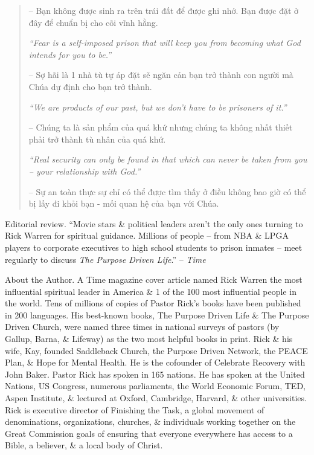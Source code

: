 \documentclass{article}
\begin{document}
\begin{enumerate}
\begin{quotation}
		-- Bạn không được sinh ra trên trái đất để được ghi nhớ. Bạn được đặt ở đây để chuẩn bị cho cõi vĩnh hằng.

		{\it``Fear is a self-imposed prison that will keep you from becoming what God intends for you to be.''}

		-- Sợ hãi là 1 nhà tù tự áp đặt sẽ ngăn cản bạn trở thành con người mà Chúa dự định cho bạn trở thành.

		{\it``We are products of our past, but we don't have to be prisoners of it.''}

		-- Chúng ta là sản phẩm của quá khứ nhưng chúng ta không nhất thiết phải trở thành tù nhân của quá khứ.

		{\it``Real security can only be found in that which can never be taken from you -- your relationship with God.''}

		-- Sự an toàn thực sự chỉ có thể được tìm thấy ở điều không bao giờ có thể bị lấy đi khỏi bạn - mối quan hệ của bạn với Chúa.
	\end{quotation}
	{\sf Editorial review.} ``Movie stars \& political leaders aren't the only ones turning to {\sc Rick Warren} for spiritual guidance. Millions of people -- from NBA \& LPGA players to corporate executives to high school students to prison inmates -- meet regularly to discuss {\it The Purpose Driven Life}.'' -- {\it Time}

	{\sf About the Author.} A Time magazine cover article named Rick Warren the most influential spiritual leader in America \& 1 of the 100 most influential people in the world. Tens of millions of copies of Pastor Rick's books have been published in 200 languages. His best-known books, The Purpose Driven Life \& The Purpose Driven Church, were named three times in national surveys of pastors (by Gallup, Barna, \& Lifeway) as the two most helpful books in print. Rick \& his wife, Kay, founded Saddleback Church, the Purpose Driven Network, the PEACE Plan, \& Hope for Mental Health. He is the cofounder of Celebrate Recovery with John Baker. Pastor Rick has spoken in 165 nations. He has spoken at the United Nations, US Congress, numerous parliaments, the World Economic Forum, TED, Aspen Institute, \& lectured at Oxford, Cambridge, Harvard, \& other universities. Rick is executive director of Finishing the Task, a global movement of denominations, organizations, churches, \& individuals working together on the Great Commission goals of ensuring that everyone everywhere has access to a Bible, a believer, \& a local body of Christ.
\end{enumerate}
\end{document}
